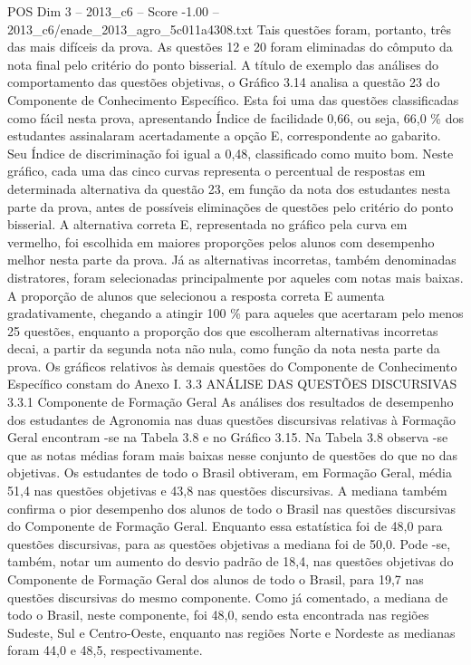 \begin{textsample}{POS Dim 3 – 2013\_c6 – Score -1.00 – 2013\_c6/enade\_2013\_agro\_5c011a4308.txt}
Tais questões foram, portanto, três das mais difíceis da prova.
As questões 12 e 20 foram eliminadas do cômputo da nota final pelo critério do ponto bisserial.
A título de exemplo das análises do comportamento das questões objetivas, o Gráfico 3.14 analisa a questão 23 do Componente de Conhecimento Específico.
Esta foi uma das questões classificadas como fácil nesta prova, apresentando Índice de facilidade 0,66, ou seja, 66,0 \% dos estudantes assinalaram acertadamente a opção E, correspondente ao gabarito.
Seu Índice de discriminação foi igual a 0,48, classificado como muito bom.
Neste gráfico, cada uma das cinco curvas representa o percentual de respostas em determinada alternativa da questão 23, em função da nota dos estudantes nesta parte da prova, antes de possíveis eliminações de questões pelo critério do ponto bisserial.
A alternativa correta E, representada no gráfico pela curva em vermelho, foi escolhida em maiores proporções pelos alunos com desempenho melhor nesta parte da prova.
Já as alternativas incorretas, também denominadas distratores, foram selecionadas principalmente por aqueles com notas mais baixas.
A proporção de alunos que selecionou a resposta correta E aumenta gradativamente, chegando a atingir 100 \% para aqueles que acertaram pelo menos 25 questões, enquanto a proporção dos que escolheram alternativas incorretas decai, a partir da segunda nota não nula, como função da nota nesta parte da prova.
Os gráficos relativos às demais questões do Componente de Conhecimento Específico constam do Anexo I. 3.3 ANÁLISE DAS QUESTÕES DISCURSIVAS 3.3.1 Componente de Formação Geral As análises dos resultados de desempenho dos estudantes de Agronomia nas duas questões discursivas relativas à Formação Geral encontram -se na Tabela 3.8 e no Gráfico 3.15.
Na Tabela 3.8 observa -se que as notas médias foram mais baixas nesse conjunto de questões do que no das objetivas.
Os estudantes de todo o Brasil obtiveram, em Formação Geral, média 51,4 nas questões objetivas e 43,8 nas questões discursivas.
A mediana também confirma o pior desempenho dos alunos de todo o Brasil nas questões discursivas do Componente de Formação Geral.
Enquanto essa estatística foi de 48,0 para questões discursivas, para as questões objetivas a mediana foi de 50,0.
Pode -se, também, notar um aumento do desvio padrão de 18,4, nas questões objetivas do Componente de Formação Geral dos alunos de todo o Brasil, para 19,7 nas questões discursivas do mesmo componente.
Como já comentado, a mediana de todo o Brasil, neste componente, foi 48,0, sendo esta encontrada nas regiões Sudeste, Sul e Centro-Oeste, enquanto nas regiões Norte e Nordeste as medianas foram 44,0 e 48,5, respectivamente.

\end{textsample}
